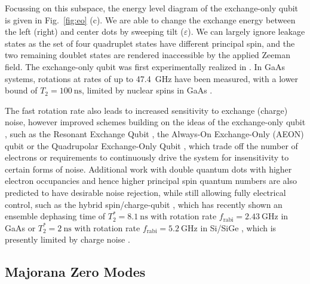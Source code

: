 Focussing on this subspace, the energy level diagram of the exchange-only qubit is given in Fig.~\ref{fig:eo} (c). We are able to change the exchange
energy between the left (right) and center dots by sweeping tilt ($\varepsilon$). We can largely ignore leakage states as the set of four quadruplet
states have different principal spin, and the two remaining doublet states are rendered inaccessible by the applied Zeeman field. The exchange-only
qubit was first experimentally realized in \cite{PhysRevB.82.075403}. In GaAs systems, rotations at rates of up to \SI{47.4}{\giga\hertz} have been measured,
with a lower bound of $T_2 = \SI{100}{\nano\second}$, limited by nuclear spins in GaAs \cite{nnano.2013.168}.

The fast rotation rate also leads to increased sensitivity to exchange (charge) noise, however improved schemes building
on the ideas of the exchange-only qubit \cite{Russ_2017}, such as the Resonant Exchange Qubit \cite{PhysRevLett.111.050501},
the Always-On Exchange-Only (AEON) qubit \cite{PhysRevB.93.121410} or the Quadrupolar Exchange-Only Qubit \cite{PhysRevLett.121.177701,Kornich_2018},
which trade off the number of electrons or requirements to continuously drive the system for insensitivity to certain forms of noise.
Additional work with double quantum dots with higher electron occupancies and hence higher principal spin quantum numbers are also
predicted to have desirable noise rejection, while still allowing fully electrical control, such as the hybrid
spin/charge-qubit \cite{PhysRevLett.108.140503}, which has recently shown an ensemble dephasing time
of $T_2^* = \SI{8.1}{\nano\second}$ with rotation rate $f_{\textrm{rabi}} = \SI{2.43}{\giga\hertz}$ in
GaAs \cite{PhysRevLett.116.086801} or $T_2^* = \SI{2}{\nano\second}$ with rotation rate $f_{\textrm{rabi}} = \SI{5.2}{\giga\hertz}$ in
Si/SiGe \cite{nature13407}, which is presently limited by charge noise \cite{s41534-017-0034-2}.

\subsection{Majorana Zero Modes}
\label{sec:majo}


